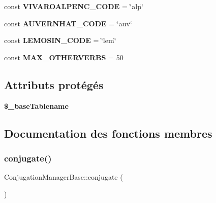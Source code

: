 \begin{DoxyCompactItemize}
\item 
\hypertarget{classConjugationManagerBase_a73f34b8b178aa35bcc8d35515e44d306}{}\label{classConjugationManagerBase_a73f34b8b178aa35bcc8d35515e44d306} 
const {\bfseries V\+I\+V\+A\+R\+O\+A\+L\+P\+E\+N\+C\+\_\+\+C\+O\+DE} = \char`\"{}alp\char`\"{}
\item 
\hypertarget{classConjugationManagerBase_ac915776393fb88313fc9594acabc5c0e}{}\label{classConjugationManagerBase_ac915776393fb88313fc9594acabc5c0e} 
const {\bfseries A\+U\+V\+E\+R\+N\+H\+A\+T\+\_\+\+C\+O\+DE} = \char`\"{}auv\char`\"{}
\item 
\hypertarget{classConjugationManagerBase_ab0a3fa2a7d3193603810cf5bed0a43b4}{}\label{classConjugationManagerBase_ab0a3fa2a7d3193603810cf5bed0a43b4} 
const {\bfseries L\+E\+M\+O\+S\+I\+N\+\_\+\+C\+O\+DE} = \char`\"{}lem\char`\"{}
\item 
\hypertarget{classConjugationManagerBase_acccc3a065b6c4c237da9519ee533e698}{}\label{classConjugationManagerBase_acccc3a065b6c4c237da9519ee533e698} 
const {\bfseries M\+A\+X\+\_\+\+O\+T\+H\+E\+R\+V\+E\+R\+BS} = 50
\end{DoxyCompactItemize}
\subsection*{Attributs protégés}
\begin{DoxyCompactItemize}
\item 
\hypertarget{classConjugationManagerBase_a9c3e02fa3b9610f261885b032164d81b}{}\label{classConjugationManagerBase_a9c3e02fa3b9610f261885b032164d81b} 
{\bfseries \$\+\_\+base\+Tablename}
\end{DoxyCompactItemize}


\subsection{Documentation des fonctions membres}
\hypertarget{classConjugationManagerBase_a20e28aa17935e10b1a763b39a3c4fdf3}{}\label{classConjugationManagerBase_a20e28aa17935e10b1a763b39a3c4fdf3} 
\subsubsection{\texorpdfstring{conjugate()}{conjugate()}}
{\footnotesize\ttfamily Conjugation\+Manager\+Base\+::conjugate (\begin{DoxyParamCaption}{ }\end{DoxyParamCaption})}



